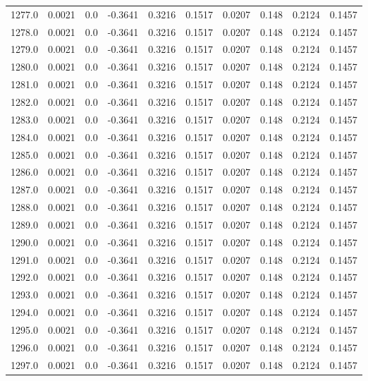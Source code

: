 \begin{longtable}{lrrrrrrrrr}
1277.0 & 0.0021 & 0.0 & -0.3641 & 0.3216 & 0.1517 & 0.0207 & 0.148 & 0.2124 & 0.1457 \\
1278.0 & 0.0021 & 0.0 & -0.3641 & 0.3216 & 0.1517 & 0.0207 & 0.148 & 0.2124 & 0.1457 \\
1279.0 & 0.0021 & 0.0 & -0.3641 & 0.3216 & 0.1517 & 0.0207 & 0.148 & 0.2124 & 0.1457 \\
1280.0 & 0.0021 & 0.0 & -0.3641 & 0.3216 & 0.1517 & 0.0207 & 0.148 & 0.2124 & 0.1457 \\
1281.0 & 0.0021 & 0.0 & -0.3641 & 0.3216 & 0.1517 & 0.0207 & 0.148 & 0.2124 & 0.1457 \\
1282.0 & 0.0021 & 0.0 & -0.3641 & 0.3216 & 0.1517 & 0.0207 & 0.148 & 0.2124 & 0.1457 \\
1283.0 & 0.0021 & 0.0 & -0.3641 & 0.3216 & 0.1517 & 0.0207 & 0.148 & 0.2124 & 0.1457 \\
1284.0 & 0.0021 & 0.0 & -0.3641 & 0.3216 & 0.1517 & 0.0207 & 0.148 & 0.2124 & 0.1457 \\
1285.0 & 0.0021 & 0.0 & -0.3641 & 0.3216 & 0.1517 & 0.0207 & 0.148 & 0.2124 & 0.1457 \\
1286.0 & 0.0021 & 0.0 & -0.3641 & 0.3216 & 0.1517 & 0.0207 & 0.148 & 0.2124 & 0.1457 \\
1287.0 & 0.0021 & 0.0 & -0.3641 & 0.3216 & 0.1517 & 0.0207 & 0.148 & 0.2124 & 0.1457 \\
1288.0 & 0.0021 & 0.0 & -0.3641 & 0.3216 & 0.1517 & 0.0207 & 0.148 & 0.2124 & 0.1457 \\
1289.0 & 0.0021 & 0.0 & -0.3641 & 0.3216 & 0.1517 & 0.0207 & 0.148 & 0.2124 & 0.1457 \\
1290.0 & 0.0021 & 0.0 & -0.3641 & 0.3216 & 0.1517 & 0.0207 & 0.148 & 0.2124 & 0.1457 \\
1291.0 & 0.0021 & 0.0 & -0.3641 & 0.3216 & 0.1517 & 0.0207 & 0.148 & 0.2124 & 0.1457 \\
1292.0 & 0.0021 & 0.0 & -0.3641 & 0.3216 & 0.1517 & 0.0207 & 0.148 & 0.2124 & 0.1457 \\
1293.0 & 0.0021 & 0.0 & -0.3641 & 0.3216 & 0.1517 & 0.0207 & 0.148 & 0.2124 & 0.1457 \\
1294.0 & 0.0021 & 0.0 & -0.3641 & 0.3216 & 0.1517 & 0.0207 & 0.148 & 0.2124 & 0.1457 \\
1295.0 & 0.0021 & 0.0 & -0.3641 & 0.3216 & 0.1517 & 0.0207 & 0.148 & 0.2124 & 0.1457 \\
1296.0 & 0.0021 & 0.0 & -0.3641 & 0.3216 & 0.1517 & 0.0207 & 0.148 & 0.2124 & 0.1457 \\
1297.0 & 0.0021 & 0.0 & -0.3641 & 0.3216 & 0.1517 & 0.0207 & 0.148 & 0.2124 & 0.1457 \\

\end{longtable}
